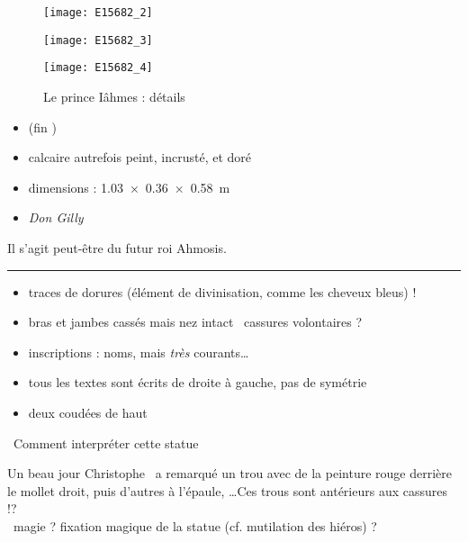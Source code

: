\documentclass[dvipsnames,a4paper,twoside,10pt,openany,article]{memoir}
\newcommand{\separation}{%
  {\noi\hspace*{\fill}\rule{.33\textwidth}{1pt}\hspace*{\fill}}%
}
\begin{document}
\begin{figure}
  \noi\begin{minipage}[b]{0.33\textwidth}%
    \centerfloat
    \texttt{[image: E15682\_2]}
  \end{minipage}%
  \hfill%
  \begin{minipage}[b]{0.33\textwidth}%
    \centerfloat
    \texttt{[image: E15682\_3]}
  \end{minipage}%
  \hfill%
  \begin{minipage}[b]{0.33\textwidth}%
    \centerfloat
    \texttt{[image: E15682\_4]}
  \end{minipage}%
  \caption{Le prince Iâhmes  : détails}%
  \label{fig:E15682_det}%
\end{figure}


\begin{itemize}
  \item {} (fin )
  \item calcaire autrefois peint, incrusté, et doré
  \item dimensions : \SI{1.03x0.36x0.58}{\m}
  \item \emph{Don Gilly}
\end{itemize}

Il s'agit peut-être du futur roi Ahmosis.

\separation

\begin{itemize}
  \item traces de dorures (élément de divinisation, comme les cheveux 
        bleus) !
  \item bras et jambes cassés mais nez intact \donc~cassures 
        volontaires ?
  \item inscriptions : noms, mais \emph{très} courants\dots
  \item tous les textes sont écrits de droite à gauche, pas de symétrie
  \item deux coudées de haut
\end{itemize}

\quad\donc~Comment interpréter cette statue~

Un beau jour Christophe~ a remarqué un trou avec de 
la peinture rouge derrière le mollet droit, puis d'autres à l'épaule, 
\dots Ces trous sont antérieurs aux cassures !?\\
\quad\donc~magie ? fixation magique de la statue 
(cf. mutilation des hiéros) ?
\end{document}
